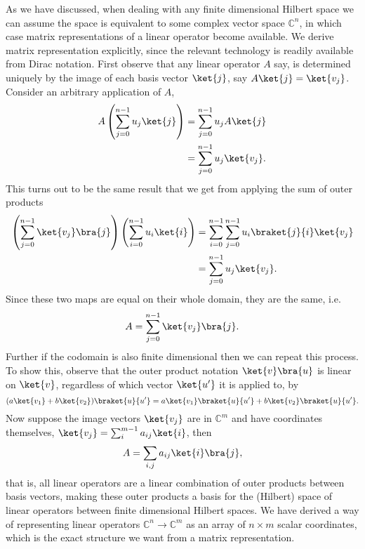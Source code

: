 As we have discussed, when dealing with any finite dimensional Hilbert space we can assume the space is equivalent to some complex vector space $\mathbb{C}^n$, in which case matrix representations of a linear operator become available. We derive matrix representation explicitly, since the relevant technology is readily available from Dirac notation. First observe that any linear operator $A$ say, is determined uniquely by the image of each basis vector $\ket{j}$, say $A\ket{j} = \ket{v_j}$. Consider an arbitrary application of $A$,
\begin{align*}
	A\left(\sum_{j=0}^{n-1}u_j\ket{j}\right)
	&= \sum_{j=0}^{n-1}u_jA\ket{j}
	\\&= \sum_{j=0}^{n-1}u_j\ket{v_j}.
\end{align*}
This turns out to be the same result that we get from applying the sum of outer products
\begin{align*}
	\left(\sum_{j=0}^{n-1}\ket{v_j}\bra{j}\right)\left(\sum_{i=0}^{n-1}u_i\ket{i}\right)
	&= \sum_{i=0}^{n-1}\sum_{j=0}^{n-1}u_i\braket{j}{i}\ket{v_j}
	\\&= \sum_{j=0}^{n-1}u_j\ket{v_j}.
\end{align*}
Since these two maps are equal on their whole domain, they are the same, i.e.
\[A = \sum_{j=0}^{n-1} \ket{v_j}\bra{j}.\]
Further if the codomain is also finite dimensional then we can repeat this process. To show this, observe that the outer product notation $\ket{v}\bra{u}$ is linear on $\ket{v}$, regardless of which vector $\ket{u'}$ it is applied to, by
\[(a\ket{v_1}+b\ket{v_2})\braket{u}{u'} = a\ket{v_1}\braket{u}{u'}+b\ket{v_2}\braket{u}{u'}.\]
Now suppose the image vectors $\ket{v_j}$ are in $\mathbb{C}^m$ and have coordinates themselves, $\ket{v_j} = \sum_i^{m-1} a_{ij}\ket{i}$, then
\begin{align*}
	A = \sum_{i,j} a_{ij}\ket{i}\bra{j},
\end{align*}
that is, all linear operators are a linear combination of outer products between basis vectors, making these outer products a basis for the (Hilbert) space of linear operators between finite dimensional Hilbert spaces. We have derived a way of representing linear operators $\mathbb{C}^n \to \mathbb{C}^m$ as an array of $n \times m$ scalar coordinates, which is the exact structure we want from a matrix representation.

